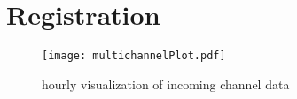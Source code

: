 \documentclass[12pt]{article} \usepackage{graphicx}
\begin{document}
\maketitle




\section{Registration}
\begin{figure}[H]
\centering
  \texttt{[image: multichannelPlot.pdf]}
\caption{hourly visualization of incoming channel data}
\end{figure}
\end{document}
